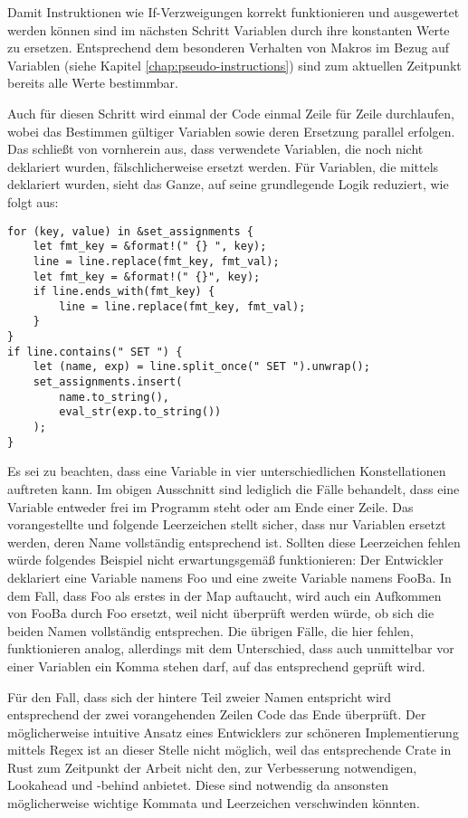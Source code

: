Damit Instruktionen wie If-Verzweigungen korrekt funktionieren und ausgewertet werden können sind im nächsten Schritt Variablen durch ihre konstanten Werte zu ersetzen. Entsprechend dem besonderen Verhalten von Makros im Bezug auf Variablen (siehe Kapitel \ref{chap:pseudo-instructions}) sind zum aktuellen Zeitpunkt bereits alle Werte bestimmbar.

Auch für diesen Schritt wird einmal der Code einmal Zeile für Zeile durchlaufen, wobei das Bestimmen gültiger Variablen sowie deren Ersetzung parallel erfolgen. Das schließt von vornherein aus, dass verwendete Variablen, die noch nicht deklariert wurden, fälschlicherweise ersetzt werden. Für Variablen, die mittels  deklariert wurden, sieht das Ganze, auf seine grundlegende Logik reduziert, wie folgt aus:

\begin{verbatim}
for (key, value) in &set_assignments {
	let fmt_key = &format!(" {} ", key);
	line = line.replace(fmt_key, fmt_val);
	let fmt_key = &format!(" {}", key);
    if line.ends_with(fmt_key) {
    	line = line.replace(fmt_key, fmt_val);
    }
}
if line.contains(" SET ") {
	let (name, exp) = line.split_once(" SET ").unwrap();
    set_assignments.insert(
    	name.to_string(),
    	eval_str(exp.to_string())
    );
}
\end{verbatim}

Es sei zu beachten, dass eine Variable in vier unterschiedlichen Konstellationen auftreten kann. Im obigen Ausschnitt sind lediglich die Fälle behandelt, dass eine Variable entweder frei im Programm steht oder am Ende einer Zeile. Das vorangestellte und folgende Leerzeichen stellt sicher, dass nur Variablen ersetzt werden, deren Name vollständig entsprechend ist. Sollten diese Leerzeichen fehlen würde folgendes Beispiel nicht erwartungsgemäß funktionieren: Der Entwickler deklariert eine Variable namens \glqq Foo\grqq{} und eine zweite Variable namens \glqq FooBa\grqq. In dem Fall, dass Foo als erstes in der Map  auftaucht, wird auch ein Aufkommen von FooBa durch Foo ersetzt, weil nicht überprüft werden würde, ob sich die beiden Namen vollständig entsprechen.
Die übrigen Fälle, die hier fehlen, funktionieren analog, allerdings mit dem Unterschied, dass auch unmittelbar vor einer Variablen ein Komma stehen darf, auf das entsprechend geprüft wird.

Für den Fall, dass sich der hintere Teil zweier Namen entspricht wird entsprechend der zwei vorangehenden Zeilen Code das Ende überprüft. Der möglicherweise intuitive Ansatz eines Entwicklers zur schöneren Implementierung mittels Regex ist an dieser Stelle nicht möglich, weil das entsprechende Crate in Rust zum Zeitpunkt der Arbeit nicht den, zur Verbesserung notwendigen, Lookahead und -behind anbietet. Diese sind notwendig da ansonsten möglicherweise wichtige Kommata und Leerzeichen verschwinden könnten.

